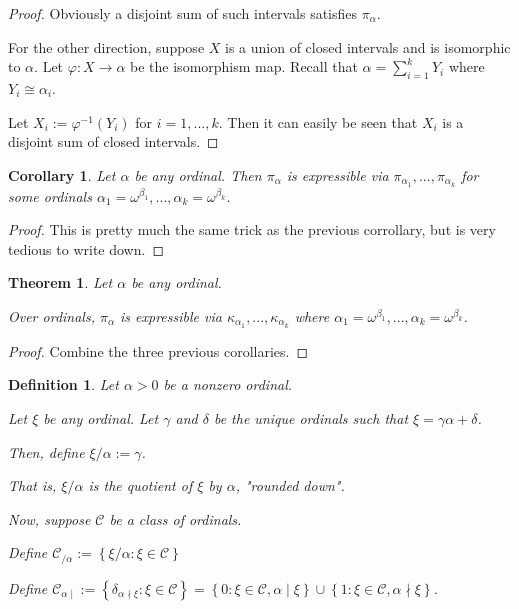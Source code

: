 \documentclass{article}
\newtheorem{theorem}{Theorem}
\newtheorem{corollary}{Corollary}
\newtheorem{definition}{Definition}
\newcommand{\braces}[1]{\left\{ {#1} \right\}}
\newcommand{\setcomp}[2]{\braces{{#1} : {#2}}}
\newcommand{\kk}[1]{{\kappa}_{#1}}
\newcommand{\pp}[1]{{\pi}_{#1}}
\newcommand{\CC}{\mathcal{C}}
\begin{document}
\begin{proof}
    Obviously a disjoint sum of such
    intervals satisfies $\pp{\alpha}$.

    For the other direction, suppose $X$ is a union
    of closed intervals and
    is isomorphic to $\alpha$.
    Let $\varphi : X \to \alpha$ be the isomorphism map.
    Recall that $\alpha = \sum_{i=1}^k Y_i$ where
    $Y_i \cong \alpha_i$.
    
    Let $X_i := \varphi^{-1}(Y_i)$ for $i = 1, ..., k$.
    Then it can easily be seen that $X_i$ is
    a disjoint sum of closed intervals.
\end{proof}

\begin{corollary}
    Let $\alpha$ be any ordinal.
    Then $\pp{\alpha}$ is expressible via $\pp{\alpha_1}, ..., \pp{\alpha_k}$
    for some ordinals
    $\alpha_1 = \omega^{\beta_1}, ..., \alpha_k = \omega^{\beta_k}$.
\end{corollary}

\begin{proof}
    This is pretty much the same trick as the previous corrollary,
    but is very tedious to write down.
\end{proof}

\begin{theorem}
    Let $\alpha$ be any ordinal.

    Over ordinals, $\pp{\alpha}$ is expressible via
    $\kk{\alpha_1}, ..., \kk{\alpha_k}$
    where $\alpha_1 = \omega^{\beta_1}, ..., \alpha_k = \omega^{\beta_k}$.
\end{theorem}

\begin{proof}
    Combine the three previous corollaries.
\end{proof}

\begin{definition}
    Let $\alpha > 0$ be a nonzero ordinal.

    Let $\xi$ be any ordinal.
    Let $\gamma$ and $\delta$ be the unique ordinals
    such that $\xi = \gamma \alpha + \delta$.

    Then, define $\xi / \alpha := \gamma$.

    That is, $\xi / \alpha$ is the quotient of $\xi$ by $\alpha$, "rounded down".

    Now, suppose $\CC$ be a class of ordinals.

    Define $\CC_{/\alpha} := \setcomp{\xi / \alpha}{\xi \in \CC}$

    Define $\CC_{\alpha\mid}
    := \setcomp{\delta_{\alpha \nmid \xi} }{\xi \in \CC}
     = \setcomp{0}{\xi \in \CC, \alpha \mid \xi}
     \cup \setcomp{1}{\xi \in \CC, \alpha \nmid \xi}$.

\end{definition}
\end{document}
